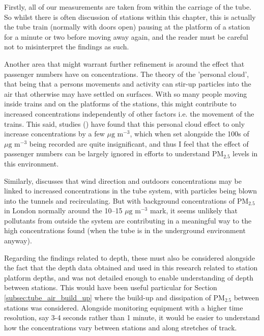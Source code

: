 Firstly, all of our measurements are taken from within the carriage of the tube. So whilst there is often discussion of stations within this chapter, this is actually the tube train (normally with doors open) pausing at the platform of a station for a minute or two before moving away again, and the reader must be careful not to misinterpret the findings as such. 

Another area that might warrant further refinement is around the effect that passenger numbers have on concentrations. The theory of the 'personal cloud', that being that a persons movements and activity can stir-up particles into the air that otherwise may have settled on surfaces. With so many people moving inside trains and on the platforms of the stations, this might contribute to increased concentrations independently of other factors i.e. the movement of the trains. This said, studies (\cite{Ferro2004a}) have found that this personal cloud effect to only increase concentrations by a few $\mu \text{g m}^{-3}$, which when set alongside the 100s of $\mu \text{g m}^{-3}$ being recorded are quite insignificant, and thus I feel that the effect of passenger numbers can be largely ignored in efforts to understand PM$_{2.5}$ levels in this environment.

Similarly, \cite{Adams2001a} discusses that wind direction and outdoors concentrations may be linked to increased concentrations in the tube system, with particles being blown into the tunnels and recirculating. But with background concentrations of PM$_{2.5}$ in London normally around the 10--15 $\mu \text{g m}^{-3}$ mark, it seems unlikely that pollutants from outside the system are contributing in a meaningful way to the high concentrations found (when the tube is in the underground environment anyway). 

Regarding the findings related to depth, these must also be considered alongside the fact that the depth data obtained and used in this research related to station platform depths, and was not detailed enough to enable understanding of depth between stations. This would have been useful particular for Section \ref{subsec:tube_air_build_up} where the build-up and dissipation of PM$_{2.5}$ between stations was considered. Alongside monitoring equipment with a higher time resolution, say 3-4 seconds rather than 1 minute, it would be easier to understand how the concentrations vary between stations and along stretches of track.

